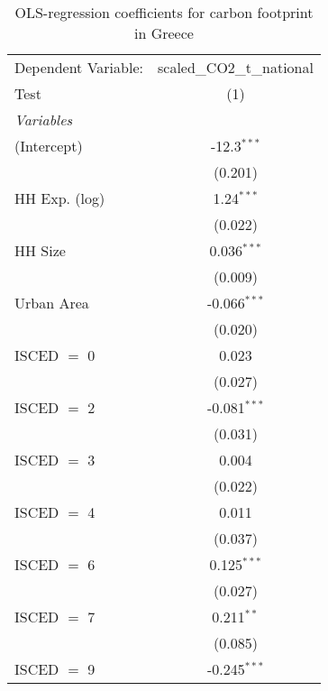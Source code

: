 
\begin{table}[htbp!]
   \centering
   \small
   \begin{adjustbox}{width = 1\textwidth, max height = 0.95\textheight, center}
      \begin{threeparttable}[b]
         \caption{\label{tab:OLS_2_GRC} OLS-regression coefficients for carbon footprint in Greece}
         \begin{tabular}{lc}
            \tabularnewline \midrule \midrule
            Dependent Variable: & scaled\_CO2\_t\_national\\     
            Test                & (1)\\  
            \midrule
            \emph{Variables}\\
            (Intercept)         & -12.3$^{***}$\\   
                                & (0.201)\\   
            HH Exp. (log)       & 1.24$^{***}$\\   
                                & (0.022)\\   
            HH Size             & 0.036$^{***}$\\   
                                & (0.009)\\   
            Urban Area          & -0.066$^{***}$\\   
                                & (0.020)\\   
            ISCED $=$ 0         & 0.023\\   
                                & (0.027)\\   
            ISCED $=$ 2         & -0.081$^{***}$\\   
                                & (0.031)\\   
            ISCED $=$ 3         & 0.004\\   
                                & (0.022)\\   
            ISCED $=$ 4         & 0.011\\   
                                & (0.037)\\   
            ISCED $=$ 6         & 0.125$^{***}$\\   
                                & (0.027)\\   
            ISCED $=$ 7         & 0.211$^{**}$\\   
                                & (0.085)\\   
            ISCED $=$ 9         & -0.245$^{***}$\\   

\end{tabular}
\end{threeparttable}
\end{adjustbox}
\end{table}
